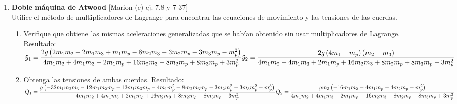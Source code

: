 \documentclass[11pt, spanish, a4paper, twoside]{article}
\begin{document}
\begin{enumerate}
	
	\item
	\begin{minipage}[t][7.5cm]{0.67\textwidth}
	\textbf{Doble máquina de Atwood} [Marion (e) ej. 7.8 y 7-37]\\
	Utilice el método de multiplicadores de Lagrange para encontrar las ecuaciones de movimiento y las tensiones de las cuerdas.
	\begin{enumerate}
		\item Verifique que obtiene las mismas aceleraciones generalizadas que se habían obtenido sin usar multiplicadores de Lagrange.
		Resultado:\\[5 pt]
		\(
			\ddot{y}_{1} = 
			\dfrac{2 g \left(2 m_{1} m_{2} + 2 m_{1} m_{3} + m_{1} m_{p} - 8 m_{2} m_{3} - 3 m_{2} m_{p} - 3 m_{3} m_{p} - m_{p}^{2}\right)}{4 m_{1} m_{2} + 4 m_{1} m_{3} + 2 m_{1} m_{p} + 16 m_{2} m_{3} + 8 m_{2} m_{p} + 8 m_{3} m_{p} + 3 m_{p}^{2}}\\[5 pt]
			\ddot{y}_{2} = 
			\dfrac{2 g \left(4 m_{1} + m_{p}\right) \left(m_{2} - m_{3}\right)}{4 m_{1} m_{2} + 4 m_{1} m_{3} + 2 m_{1} m_{p} + 16 m_{2} m_{3} + 8 m_{2} m_{p} + 8 m_{3} m_{p} + 3 m_{p}^{2}}
		\)
		\item Obtenga las tensiones de ambas cuerdas.
			Resultado:\\[5 pt]
			\(
				Q_{1} = \dfrac{g \left(- 32 m_{1} m_{2} m_{3} - 12 m_{1} m_{2} m_{p} - 12 m_{1} m_{3} m_{p} - 4 m_{1} m_{p}^{2} - 8 m_{2} m_{3} m_{p} - 3 m_{2} m_{p}^{2} - 3 m_{3} m_{p}^{2} - m_{p}^{3}\right)}{4 m_{1} m_{2} + 4 m_{1} m_{3} + 2 m_{1} m_{p} + 16 m_{2} m_{3} + 8 m_{2} m_{p} + 8 m_{3} m_{p} + 3 m_{p}^{2}}
				\\[5 pt]
				Q_{2} = \dfrac{g m_{3} \left(- 16 m_{1} m_{2} - 4 m_{1} m_{p} - 4 m_{2} m_{p} - m_{p}^{2}\right)}{4 m_{1} m_{2} + 4 m_{1} m_{3} + 2 m_{1} m_{p} + 16 m_{2} m_{3} + 8 m_{2} m_{p} + 8 m_{3} m_{p} + 3 m_{p}^{2}}
			\)
		\end{enumerate}
	\end{minipage}
	\begin{minipage}[c][2cm][t]{0.3\textwidth}
		
	\end{minipage}


\end{enumerate}
\end{document}
